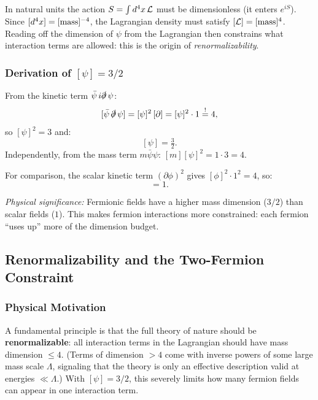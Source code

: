\documentclass[../main.tex]{subfiles}
\begin{document}
In natural units the action $S = \int d^4x\,\mathcal{L}$ must be dimensionless (it enters $e^{iS}$).  Since $[d^4x] = [{\rm mass}]^{-4}$, the Lagrangian density must satisfy $[\mathcal{L}] = [{\rm mass}]^4$.  Reading off the dimension of $\psi$ from the Lagrangian then constrains what interaction terms are allowed: this is the origin of \emph{renormalizability}.

\subsubsection*{Derivation of $[\psi] = 3/2$}

From the kinetic term $\bar\psi\,i\slashed\partial\,\psi$:
\[
  [\bar\psi\,\slashed\partial\,\psi]
  = [\psi]^2\,[\partial]
  = [\psi]^2 \cdot 1
  \stackrel{!}{=} 4,
\]
so $[\psi]^2 = 3$ and:
\begin{equation}
  \boxed{[\psi] = \tfrac{3}{2}.}
  \label{eq:lec08:psi-dim}
\end{equation}
Independently, from the mass term $m\bar\psi\psi$: $[m][\psi]^2 = 1\cdot 3 = 4$. \checkmark

For comparison, the scalar kinetic term $(\partial\phi)^2$ gives $[\phi]^2 \cdot 1^2 = 4$, so:
\begin{equation}
  [\phi] = 1.
  \label{eq:lec08:phi-dim}
\end{equation}

\textit{Physical significance:} Fermionic fields have a higher mass dimension ($3/2$) than scalar fields ($1$).  This makes fermion interactions more constrained: each fermion ``uses up'' more of the dimension budget.

\subsection*{Renormalizability and the Two-Fermion Constraint}

\subsubsection*{Physical Motivation}

A fundamental principle is that the full theory of nature should be \textbf{renormalizable}: all interaction terms in the Lagrangian should have mass dimension $\leq 4$.  (Terms of dimension $> 4$ come with inverse powers of some large mass scale $\Lambda$, signaling that the theory is only an effective description valid at energies $\ll \Lambda$.)  With $[\psi] = 3/2$, this severely limits how many fermion fields can appear in one interaction term.
\end{document}
